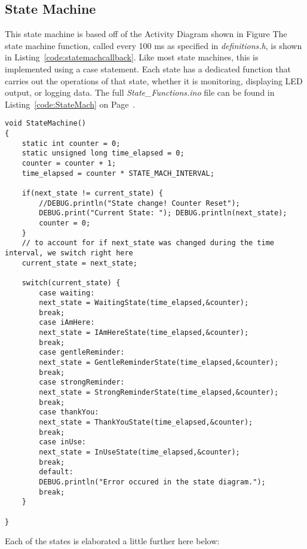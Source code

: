 \documentclass{article}
\begin{document}
\subsection{State Machine}
This state machine is based off of the Activity Diagram shown in Figure %
The state machine function, called every 100 ms as specified in \textit{definitions.h}, is shown in Listing~\ref{code:statemachcallback}. Like most state machines, this is implemented using a case statement. Each state has a dedicated function that carries out the operations of that state, whether it is monitoring, displaying LED output, or logging data. The full \textit{State\_Functions.ino} file can be found in Listing~\ref{code:StateMach} on Page~\pageref{code:StateMach}. 

\begin{lstlisting}[caption={The State Machine Callback Function}, label={code:statemachcallback}]
void StateMachine()
{ 
	static int counter = 0; 
	static unsigned long time_elapsed = 0; 
	counter = counter + 1;
	time_elapsed = counter * STATE_MACH_INTERVAL;  
	
	if(next_state != current_state) {
		//DEBUG.println("State change! Counter Reset"); 
		DEBUG.print("Current State: "); DEBUG.println(next_state); 
		counter = 0; 
	}
	// to account for if next_state was changed during the time interval, we switch right here
	current_state = next_state; 
	
	switch(current_state) {
		case waiting: 
		next_state = WaitingState(time_elapsed,&counter); 
		break; 
		case iAmHere: 
		next_state = IAmHereState(time_elapsed,&counter); 
		break; 
		case gentleReminder: 
		next_state = GentleReminderState(time_elapsed,&counter); 
		break;
		case strongReminder:
		next_state = StrongReminderState(time_elapsed,&counter); 
		break; 
		case thankYou: 
		next_state = ThankYouState(time_elapsed,&counter); 
		break;
		case inUse:
		next_state = InUseState(time_elapsed,&counter);
		break;
		default: 
		DEBUG.println("Error occured in the state diagram."); 
		break;     
	}

}
\end{lstlisting}

Each of the states is elaborated a little further here below: 
\end{document}
